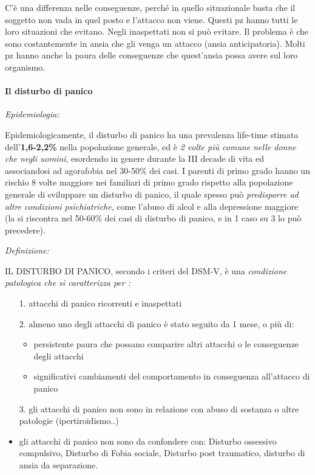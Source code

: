 C'è una differenza nelle conseguenze, perché in quello situazionale
basta che il soggetto non vada in quel posto e l'attacco non viene.
Questi pz hanno tutti le loro situazioni che evitano. Negli inaspettati
non si può evitare. Il problema è che sono costantemente in ansia che
gli venga un attacco (ansia anticipatoria). Molti pz hanno anche la
paura delle conseguenze che quest'ansia possa avere sul loro organismo.

\paragraph{Il disturbo di panico}

\emph{\emph{Epidemiologia:}}

Epidemiologicamente, il disturbo di panico ha una prevalenza life-time
stimata dell'\textbf{1,6-2,2\%} nella popolazione generale, ed è \emph{2
volte più comune nelle donne che negli uomini}, esordendo in genere
durante la III decade di vita ed associandosi ad agorafobia nel 30-50\%
dei casi. I parenti di primo grado hanno un rischio 8 volte maggiore nei
familiari di primo grado rispetto alla popolazione generale di
sviluppare un disturbo di panico, il quale spesso può \emph{predisporre
ad altre condizioni psichiatriche}, come l'abuso di alcol e alla
depressione maggiore (la si riscontra nel 50-60\% dei casi di disturbo
di panico, e in 1 caso su 3 lo può precedere).

\emph{\emph{Definizione:}}

IL DISTURBO DI PANICO, secondo i criteri del DSM-V, è una
\emph{condizione patologica che si caratterizza per :}

\begin{itemize}
\item[1.]
  attacchi di panico ricorrenti e inaspettati
\item[2.]
  almeno uno degli attacchi di panico è stato seguito da 1 mese, o più
  di:

\begin{itemize}
\item
  persistente paura che possano comparire altri attacchi o le
  conseguenze degli attacchi
\item
  significativi cambiamenti del comportamento in conseguenza all'attacco
  di panico
\end{itemize}

\item[3.]
  gli attacchi di panico non sono in relazione con abuso di sostanza o
  altre patologie (ipertiroidismo..)
\item
  gli attacchi di panico non sono da confondere con: Disturbo ossessivo
  compulsivo, Disturbo di Fobia sociale, Disturbo post traumatico,
  disturbo di ansia da separazione.
\end{itemize}


